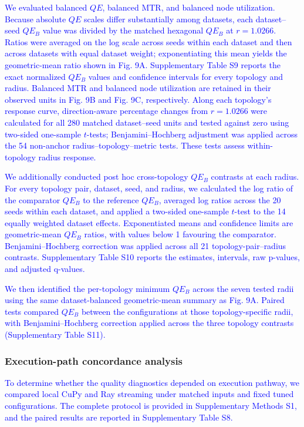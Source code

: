 \documentclass[10pt]{article} %
\newcommand{\TrackedChange}[1]{\textcolor{blue}{#1}}
\begin{document}
\TrackedChange{We evaluated balanced $QE$, balanced MTR, and balanced node utilization. Because absolute $QE$ scales differ substantially among datasets, each dataset--seed $QE_B$ value was divided by the matched hexagonal $QE_B$ at $r=1.0266$. Ratios were averaged on the log scale across seeds within each dataset and then across datasets with equal dataset weight; exponentiating this mean yields the geometric-mean ratio shown in Fig. 9A. Supplementary Table S9 reports the exact normalized $QE_B$ values and confidence intervals for every topology and radius. Balanced MTR and balanced node utilization are retained in their observed units in Fig. 9B and Fig. 9C, respectively. Along each topology's response curve, direction-aware percentage changes from $r=1.0266$ were calculated for all 280 matched dataset--seed units and tested against zero using two-sided one-sample $t$-tests; Benjamini--Hochberg adjustment was applied across the 54 non-anchor radius--topology--metric tests. These tests assess within-topology radius response.}

\TrackedChange{We additionally conducted post hoc cross-topology $QE_B$ contrasts at each radius. For every topology pair, dataset, seed, and radius, we calculated the log ratio of the comparator $QE_B$ to the reference $QE_B$, averaged log ratios across the 20 seeds within each dataset, and applied a two-sided one-sample $t$-test to the 14 equally weighted dataset effects. Exponentiated means and confidence limits are geometric-mean $QE_B$ ratios, with values below 1 favouring the comparator. Benjamini--Hochberg correction was applied across all 21 topology-pair--radius contrasts. Supplementary Table S10 reports the estimates, intervals, raw p-values, and adjusted q-values.}

\TrackedChange{We then identified the per-topology minimum $QE_B$ across the seven tested radii using the same dataset-balanced geometric-mean summary as Fig. 9A. Paired tests compared $QE_B$ between the configurations at those topology-specific radii, with Benjamini--Hochberg correction applied across the three topology contrasts (Supplementary Table S11).}

\subsubsection{Execution-path concordance analysis}

\TrackedChange{To determine whether the quality diagnostics depended on execution pathway, we compared local CuPy and Ray streaming under matched inputs and fixed tuned configurations. The complete protocol is provided in Supplementary Methods S1, and the paired results are reported in Supplementary Table S8.}
\end{document}
